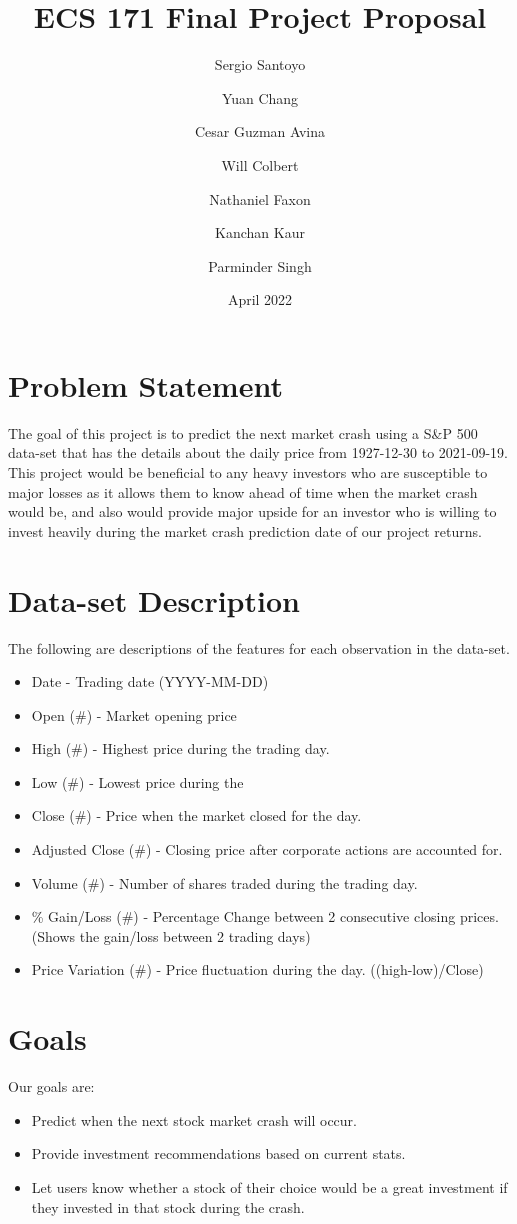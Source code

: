 \documentclass{article}
\title{ECS 171 Final Project Proposal}
\author{
  Sergio Santoyo\\
  \and
  Yuan Chang\\
  \and
  Cesar Guzman Avina\\
  \and
  Will Colbert\\
  \and
  Nathaniel Faxon\\
  \and
  Kanchan Kaur\\
  \and
  Parminder Singh\\
}
\date{April 2022}
\begin{document}
\maketitle

\section{Problem Statement}

The goal of this project is to predict the next market crash using a S\&P 500 data-set that has the details about the daily price from 1927-12-30 to 2021-09-19. This project would be beneficial to any heavy investors who are susceptible to major losses as it allows them to know ahead of time when the market crash would be, and also would provide major upside for an investor who is willing to invest heavily during the market crash prediction date of our project returns. 

\section{Data-set Description}
The following are descriptions of the features for each observation in the data-set.

	\begin{itemize}
		\item Date - Trading date (YYYY-MM-DD)
		\item Open (\#) - Market opening price
		\item High (\#) - Highest price during the trading day.
		\item Low (\#) - Lowest price during the
		\item Close (\#) - Price when the market closed for the day.
		\item Adjusted Close (\#) - Closing price after corporate actions are accounted for.
		\item Volume (\#) - Number of shares traded during the trading day.
		\item \% Gain/Loss (\#) - Percentage Change between 2 consecutive closing prices. (Shows the gain/loss between 2 trading days)
		\item Price Variation (\#) - Price fluctuation during the day. ((high-low)/Close)


	\end{itemize}
\newpage

\section{Goals}
Our goals are:
	\begin{itemize}
		\item Predict when the next stock market crash will occur.
		\item Provide investment recommendations based on current stats.
		\item Let users know whether a stock of their choice would be a great investment if they invested in that stock during the crash. 

	\end{itemize}
\end{document}
